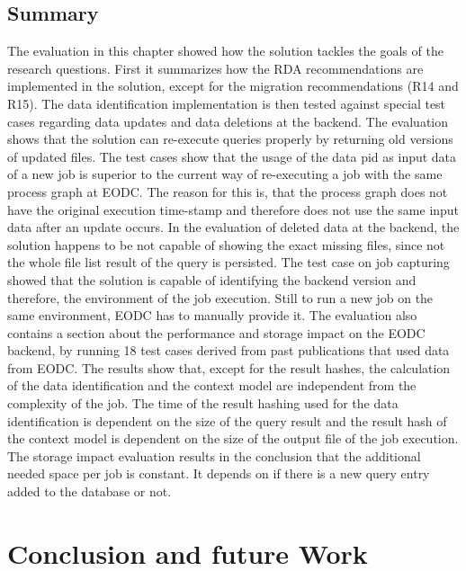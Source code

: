 \documentclass[draft,final]{vutinfth} %
\begin{document}
\section{Summary}
The evaluation in this chapter showed how the solution tackles the goals of the research questions. First it summarizes how the RDA recommendations are implemented in the solution, except for the migration recommendations (R14 and R15). The data identification implementation is then tested against special test cases regarding data updates and data deletions at the backend. The evaluation shows that the solution can re-execute queries properly by returning old versions of updated files. The test cases show that the usage of the data pid as input data of a new job is superior to the current way of re-executing a job with the same process graph at EODC. The reason for this is, that the process graph does not have the original execution time-stamp and therefore does not use the same input data after an update occurs. In the evaluation of deleted data at the backend, the solution happens to be not capable of showing the exact missing files, since not the whole file list result of the query is persisted. The test case on job capturing showed that the solution is capable of identifying the backend version and therefore, the environment of the job execution. Still to run a new job on the same environment, EODC has to manually provide it. The evaluation also contains a section about the performance and storage impact on the EODC backend, by running 18 test cases derived from past publications that used data from EODC. The results show that, except for the result hashes, the calculation of the data identification and the context model are independent from the complexity of the job. The time of the result hashing used for the data identification is dependent on the size of the query result and the result hash of the context model is dependent on the size of the output file of the job execution. The storage impact evaluation results in the conclusion that the additional needed space per job is constant. It depends on if there is a new query entry added to the database or not.
   
\chapter{Conclusion and future Work}\label{Conclusion}
\end{document}
